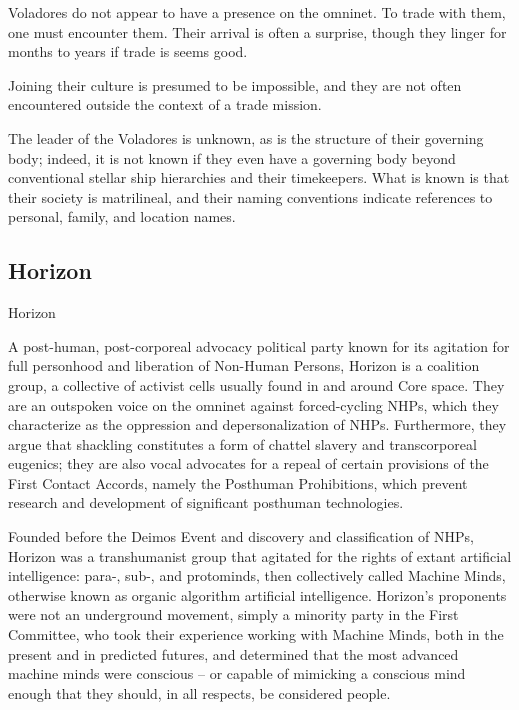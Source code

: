 Voladores do not appear to have a presence on the omninet. To trade with them, one must  
encounter them. Their arrival is often a surprise, though they linger for months to years if trade is  
seems good.  
 

Joining their culture is presumed to be impossible, and they are not often encountered outside  
the context of a trade mission. 
 

The leader of the Voladores is unknown, as is the structure of their governing body; indeed, it is  
not known if they even have a governing body beyond conventional stellar ship hierarchies and  
their timekeepers. What is known is that their society is matrilineal, and their naming conventions  
indicate references to personal, family, and location names. 
 
\subsection{Horizon}
Horizon   

A post-human, post-corporeal advocacy political party known for its agitation for full personhood  
and liberation of Non-Human Persons, Horizon is a coalition group, a collective of activist cells  
usually found in and around Core space. They are an outspoken voice on the omninet against  
forced-cycling NHPs, which they characterize as the oppression and depersonalization of NHPs.  
Furthermore, they argue that shackling constitutes a form of chattel slavery and transcorporeal  
eugenics; they are also vocal advocates for a repeal of certain provisions of the First Contact  
Accords, namely the Posthuman Prohibitions, which prevent research and development of  
significant posthuman technologies. 
 

Founded before the Deimos Event and discovery and classification of NHPs, Horizon was a  
transhumanist group that agitated for the rights of extant artificial intelligence: para-, sub-, and  
protominds, then collectively called Machine Minds, otherwise known as organic algorithm  
artificial intelligence. Horizon’s proponents were not an underground movement, simply a  
minority party in the First Committee, who took their experience working with Machine Minds,  
both in the present and in predicted futures, and determined that the most advanced machine  
minds were conscious -- or capable of mimicking a conscious mind enough that they should, in  
all respects, be considered people.
 

                                                                                                          



